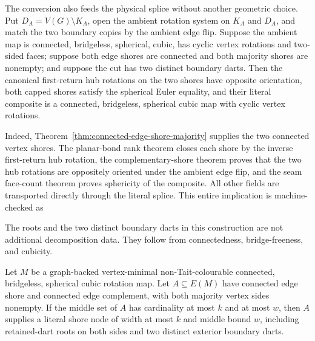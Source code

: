 The conversion also feeds the physical splice without another geometric
choice.  Put $D_A=V(G)\setminus K_A$, open the ambient rotation system on
$K_A$ and $D_A$, and match the two boundary copies by the ambient edge
flip.  Suppose the ambient map is connected, bridgeless, spherical, cubic,
has cyclic vertex rotations and two-sided faces; suppose both edge shores are
connected and both majority shores are nonempty; and suppose the cut has two
distinct boundary darts.  Then the canonical first-return hub rotations on
the two shores have opposite orientation, both capped shores satisfy the
spherical Euler equality, and their literal composite is a connected,
bridgeless, spherical cubic map with cyclic vertex rotations.

Indeed, Theorem~\ref{thm:connected-edge-shore-majority} supplies the two
connected vertex shores.  The planar-bond rank theorem closes each shore by
the inverse first-return hub rotation, the complementary-shore theorem proves
that the two hub rotations are oppositely oriented under the ambient edge
flip, and the seam face-count theorem proves sphericity of the composite.
All other fields are transported directly through the literal splice.  This
entire implication is machine-checked as

The roots and the two distinct boundary darts in this construction are not
additional decomposition data.  They follow from connectedness,
bridge-freeness, and cubicity.

\begin{lemma}
\label{lem:connected-shore-literal-node}
Let \(M\) be a graph-backed vertex-minimal non-Tait-colourable connected,
bridgeless, spherical cubic rotation map.  Let \(A\subseteq E(M)\) have
connected edge shore and connected edge complement, with both majority
vertex sides nonempty.  If the middle set of \(A\) has cardinality at most
\(k\) and at most \(w\), then \(A\) supplies a literal shore
node of width at most \(k\) and middle bound \(w\), including retained-dart
roots on both sides and two distinct exterior boundary darts.
\end{lemma}

